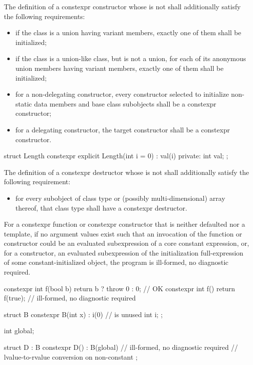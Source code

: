 \pnum
{}%
The definition of a constexpr constructor
whose  is not 
shall additionally satisfy the following requirements:
\begin{itemize}
\item
if the class is a union having variant members, exactly one of them
shall be initialized;

\item
if the class is a union-like class, but is not a union, for each of its anonymous union
members having variant members, exactly one of them shall be initialized;

\item
for a non-delegating constructor, every constructor selected to initialize non-static
data members and base class subobjects shall be a constexpr constructor;

\item
for a delegating constructor, the target constructor shall be a constexpr
constructor.
\end{itemize}

\begin{example}
\begin{codeblock}
struct Length {
  constexpr explicit Length(int i = 0) : val(i) { }
private:
  int val;
};
\end{codeblock}
\end{example}

\pnum
The definition of a constexpr destructor
whose  is not 
shall additionally satisfy the following requirement:
\begin{itemize}
\item
  for every subobject of class type or
  (possibly multi-dimensional) array thereof,
  that class type shall have a constexpr destructor.
\end{itemize}

\pnum
For a constexpr function or constexpr constructor
that is neither defaulted nor a template,
if no argument values exist such that
an invocation of the function or constructor could be an evaluated subexpression of a core
constant expression, or,
for a constructor, an evaluated subexpression of
the initialization full-expression of some constant-initialized object,
the program is ill-formed, no diagnostic required.
\begin{example}
\begin{codeblock}
constexpr int f(bool b)
  { return b ? throw 0 : 0; }           // OK
constexpr int f() { return f(true); }   // ill-formed, no diagnostic required

struct B {
  constexpr B(int x) : i(0) { }         //  is unused
  int i;
};

int global;

struct D : B {
  constexpr D() : B(global) { }         // ill-formed, no diagnostic required
                                        // lvalue-to-rvalue conversion on non-constant 
};
\end{codeblock}
\end{example}

